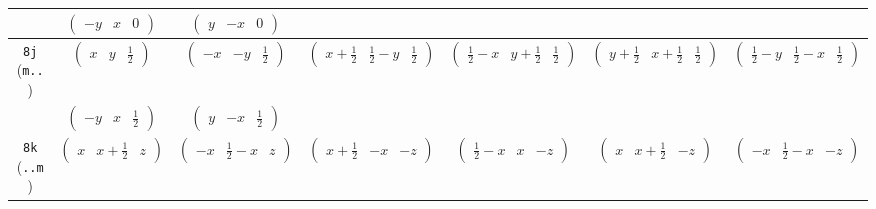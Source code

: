 \documentclass[fleqn,9pt,landscape]{jsarticle}
\begin{document}
\begin{center}
\begin{longtable}{ccccccc}
& $ \begin{pmatrix} - y & x & 0 \end{pmatrix} $ & $ \begin{pmatrix} y & - x & 0 \end{pmatrix} $ & $  $ & $  $ & $  $ & $  $ \\ \hline
{\tt 8j} ({\tt m..}) & $ \begin{pmatrix} x & y & \frac{1}{2} \end{pmatrix} $ & $ \begin{pmatrix} - x & - y & \frac{1}{2} \end{pmatrix} $ & $ \begin{pmatrix} x + \frac{1}{2} & \frac{1}{2} - y & \frac{1}{2} \end{pmatrix} $ & $ \begin{pmatrix} \frac{1}{2} - x & y + \frac{1}{2} & \frac{1}{2} \end{pmatrix} $ & $ \begin{pmatrix} y + \frac{1}{2} & x + \frac{1}{2} & \frac{1}{2} \end{pmatrix} $ & $ \begin{pmatrix} \frac{1}{2} - y & \frac{1}{2} - x & \frac{1}{2} \end{pmatrix} $ \\
& $ \begin{pmatrix} - y & x & \frac{1}{2} \end{pmatrix} $ & $ \begin{pmatrix} y & - x & \frac{1}{2} \end{pmatrix} $ & $  $ & $  $ & $  $ & $  $ \\ \hline
{\tt 8k} ({\tt ..m}) & $ \begin{pmatrix} x & x + \frac{1}{2} & z \end{pmatrix} $ & $ \begin{pmatrix} - x & \frac{1}{2} - x & z \end{pmatrix} $ & $ \begin{pmatrix} x + \frac{1}{2} & - x & - z \end{pmatrix} $ & $ \begin{pmatrix} \frac{1}{2} - x & x & - z \end{pmatrix} $ & $ \begin{pmatrix} x & x + \frac{1}{2} & - z \end{pmatrix} $ & $ \begin{pmatrix} - x & \frac{1}{2} - x & - z \end{pmatrix} $ \\

\end{longtable}
\end{center}
\end{document}
